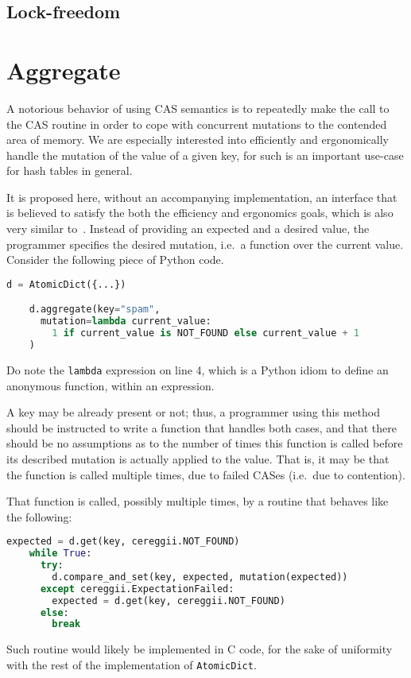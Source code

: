 \subsection{Lock-freedom}\label{subsec:batch-lookup-lock-freedom}


\section{Aggregate}\label{sec:aggregate}

A notorious behavior of using CAS semantics is to repeatedly make the call to the CAS routine in order to cope with concurrent mutations to the contended area of memory.
We are especially interested into efficiently and ergonomically handle the mutation of the value of a given key, for such is an important use-case for hash tables in general.

It is proposed here, without an accompanying implementation, an interface that is believed to satisfy the both the efficiency and ergonomics goals, which is also very similar to~\cite[Algorithm~1]{maier}.
Instead of providing an expected and a desired value, the programmer specifies the desired mutation, i.e.\ a function over the current value.
Consider the following piece of Python code.
\begin{lstlisting}[label={lst:aggregate-usage}, language=Python]
	d = AtomicDict({...})

	d.aggregate(key="spam",
	  mutation=lambda current_value:
	    1 if current_value is NOT_FOUND else current_value + 1
	)
\end{lstlisting}
Do note the \texttt{lambda} expression on line 4, which is a Python idiom to define an anonymous function, within an expression.

A key may be already present or not; thus, a programmer using this method should be instructed to write a function that handles both cases, and that there should be no assumptions as to the number of times this function is called before its described mutation is actually applied to the value.
That is, it may be that the function is called multiple times, due to failed CASes (i.e.\ due to contention).

That function is called, possibly multiple times, by a routine that behaves like the following:
\begin{lstlisting}[label={lst:aggregate}, language=Python]
	expected = d.get(key, cereggii.NOT_FOUND)
	while True:
	  try:
	    d.compare_and_set(key, expected, mutation(expected))
	  except cereggii.ExpectationFailed:
	    expected = d.get(key, cereggii.NOT_FOUND)
	  else:
	    break
\end{lstlisting}
Such routine would likely be implemented in C code, for the sake of uniformity with the rest of the implementation of \texttt{AtomicDict}.

